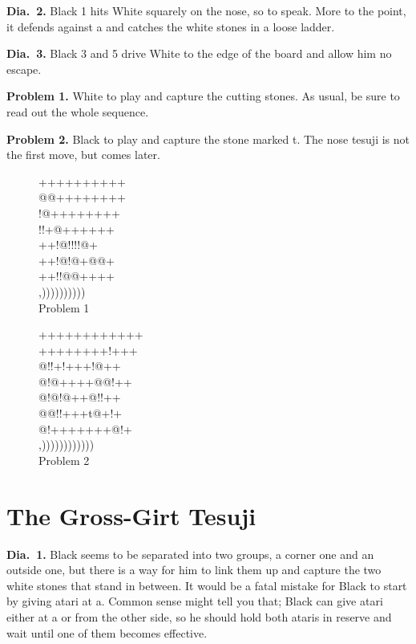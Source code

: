 \documentclass[royalvopaper,10pt,twoside,onecolumn,draft]{memoir}
\begin{document}
\noindent
\textbf{Dia.\ 2.} Black 1 hits White squarely on the nose, so to speak. More to the
point, it defends against a and catches the white stones in a loose ladder.

\noindent
\textbf{Dia.\ 3.} Black 3 and 5 drive White to the edge of the board and allow
him no escape.

\noindent
\textbf{Problem 1.} White to play and capture the cutting stones. As usual, be
sure to read out the whole sequence.

\noindent
\textbf{Problem 2.} Black to play and capture the stone marked {\gnos t}. The nose
tesuji is not the first move, but comes later.
\begin{figure}[ht]
    \begin{minipage}[c]{0.45\linewidth}
        \centering    
        {\gnos%
        ++++++++++\\
        @@++++++++\\
        !@++++++++\\
        !!+@++++++\\
        ++!@!!!!@+\\
        ++!@!@+@@+\\
        ++!!@@++++\\
        ,))))))))))\\
        }
        Problem 1
    \end{minipage}%
    \begin{minipage}[c]{0.55\linewidth}
        \centering    
        {\gnos%
        ++++++++++++\\
        ++++++++!+++\\
        @!!+!+++!@++\\
        @!@++++@@!++\\
        @!@!@++@!!++\\
        @@!!+++t@+!+\\
        @!+++++++@!+\\
        ,))))))))))))\\
        }
        Problem 2
    \end{minipage}%
\end{figure}
\section{The Gross-Girt Tesuji}

\noindent
\textbf{Dia.\ 1.} Black seems to be separated into two groups, a corner one and
an outside one, but there is a way for him to link them up and capture
the two white stones that stand in between.
It would be a fatal mistake for Black to start by giving atari at a.
Common sense might tell you that; Black can give atari either at a or
from the other side, so he should hold both ataris in reserve and wait
until one of them becomes effective.
\end{document}

